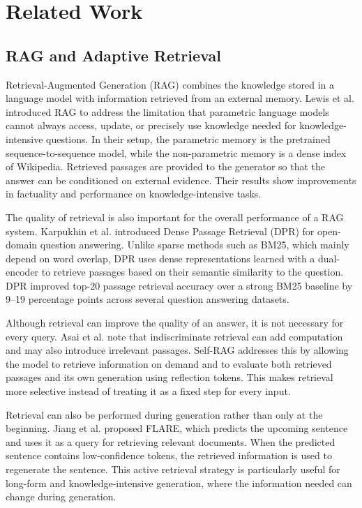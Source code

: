 \section{Related Work}
\subsection{RAG and Adaptive Retrieval}

Retrieval-Augmented Generation (RAG) combines the knowledge stored in a language model with information retrieved from an external memory. Lewis et al. introduced RAG to address the limitation that parametric language models cannot always access, update, or precisely use knowledge needed for knowledge-intensive questions. In their setup, the parametric memory is the pretrained sequence-to-sequence model, while the non-parametric memory is a dense index of Wikipedia. Retrieved passages are provided to the generator so that the answer can be conditioned on external evidence. Their results show improvements in factuality and performance on knowledge-intensive tasks.

The quality of retrieval is also important for the overall performance of a RAG system. Karpukhin et al. introduced Dense Passage Retrieval (DPR) for open-domain question answering. Unlike sparse methods such as BM25, which mainly depend on word overlap, DPR uses dense representations learned with a dual-encoder to retrieve passages based on their semantic similarity to the question. DPR improved top-20 passage retrieval accuracy over a strong BM25 baseline by 9--19 percentage points across several question answering datasets.

Although retrieval can improve the quality of an answer, it is not necessary for every query. Asai et al. note that indiscriminate retrieval can add computation and may also introduce irrelevant passages. Self-RAG addresses this by allowing the model to retrieve information on demand and to evaluate both retrieved passages and its own generation using reflection tokens. This makes retrieval more selective instead of treating it as a fixed step for every input.

Retrieval can also be performed during generation rather than only at the beginning. Jiang et al. proposed FLARE, which predicts the upcoming sentence and uses it as a query for retrieving relevant documents. When the predicted sentence contains low-confidence tokens, the retrieved information is used to regenerate the sentence. This active retrieval strategy is particularly useful for long-form and knowledge-intensive generation, where the information needed can change during generation.

